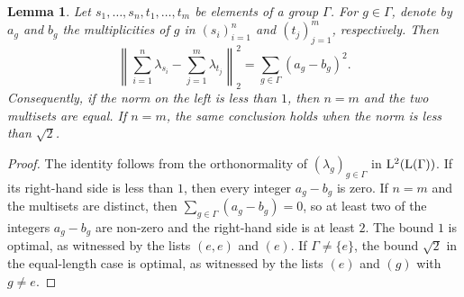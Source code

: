 \documentclass[12pt]{amsart} %
\theoremstyle{plain}
\newtheorem{lemma}[theorem]{Lemma}
\theoremstyle{definition}
\newcommand{\LL}{{\rm L}}
\begin{document}
\begin{lemma}\label{lem: close multisets are equal}
Let $s_1,\ldots,s_n,t_1,\ldots,t_m$ be elements of a group $\Gamma$. For
$g\in\Gamma$, denote by $a_g$ and $b_g$ the multiplicities of $g$ in
$(s_i)_{i=1}^n$ and $(t_j)_{j=1}^m$, respectively. Then
$$
\left\|
\sum_{i=1}^n\lambda_{s_i}
-
\sum_{j=1}^m\lambda_{t_j}
\right\|_2^2
=
\sum_{g\in\Gamma}(a_g-b_g)^2.
$$
Consequently, if the norm on the left is less than $1$, then $n=m$ and the
two multisets are equal. If $n=m$, the same conclusion holds when the norm
is less than $\sqrt2$.
\end{lemma}
\begin{proof}
The identity follows from the orthonormality of
$(\lambda_g)_{g\in\Gamma}$ in $\LL^2(\LL(\Gamma))$. If its right-hand side is less
than $1$, then every integer $a_g-b_g$ is zero. If $n=m$ and the multisets
are distinct, then $\sum_{g\in\Gamma}(a_g-b_g)=0$, so at least two of the integers $a_g-b_g$ are non-zero and the right-hand
side is at least $2$.
The bound $1$ is optimal, as witnessed by the lists $(e,e)$ and $(e)$. If
$\Gamma\neq\{e\}$, the bound $\sqrt2$ in the equal-length case is optimal, as
witnessed by the lists $(e)$ and $(g)$ with $g\neq e$.
\end{proof}

\end{document}

